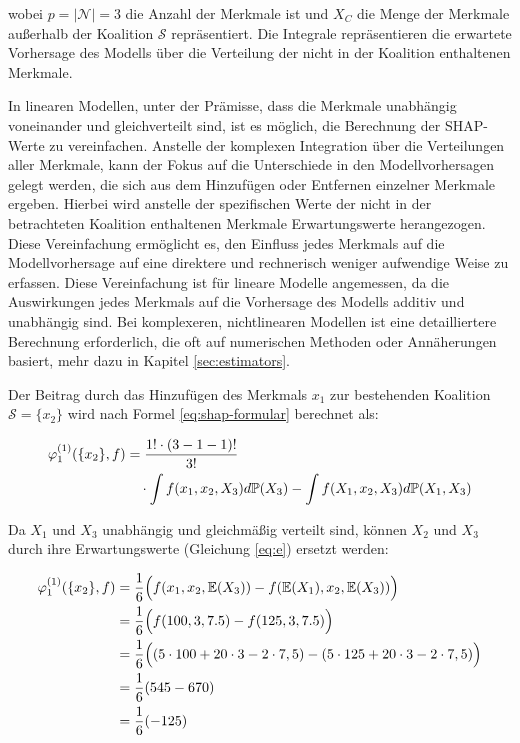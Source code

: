 wobei $p = |\mathcal{N}| = 3$ die Anzahl der Merkmale ist und $X_C$ die Menge der Merkmale 
außerhalb der Koalition $\mathcal{S}$ repräsentiert. Die Integrale repräsentieren die erwartete 
Vorhersage des Modells über die Verteilung der nicht in der Koalition enthaltenen Merkmale.

In linearen Modellen, unter der Prämisse, dass die Merkmale unabhängig voneinander und gleichverteilt sind, 
ist es möglich, die Berechnung der SHAP-Werte zu vereinfachen. Anstelle der komplexen Integration 
über die Verteilungen aller Merkmale, kann der Fokus auf die Unterschiede in den Modellvorhersagen gelegt werden, 
die sich aus dem Hinzufügen oder Entfernen einzelner Merkmale ergeben. 
Hierbei wird anstelle der spezifischen Werte der nicht in der betrachteten Koalition enthaltenen Merkmale 
Erwartungswerte herangezogen. Diese Vereinfachung ermöglicht es, den Einfluss jedes Merkmals auf 
die Modellvorhersage auf eine direktere und rechnerisch weniger aufwendige Weise zu erfassen.
Diese Vereinfachung ist für lineare Modelle angemessen, da die Auswirkungen jedes Merkmals 
auf die Vorhersage des Modells additiv und unabhängig sind. Bei komplexeren, 
nichtlinearen Modellen ist eine detailliertere Berechnung erforderlich, 
die oft auf numerischen Methoden oder Annäherungen basiert, mehr dazu in Kapitel \ref{sec:estimators}.

Der Beitrag durch das Hinzufügen des Merkmals $x_1$ zur bestehenden Koalition $\mathcal{S} = \{x_2\}$ wird
nach Formel \ref{eq:shap-formular} berechnet als:

\begin{align}
    \varphi^{(1)}_{1}(\{x_2\}, f) &= \frac{1! \cdot (3 - 1 - 1)!}{3!} \\ \notag
        &\quad \cdot \int f(x_1, x_2 , X_3) d\mathbb{P}(X_3) - \int f(X_1, x_2, X_3) d\mathbb{P}(X_1, X_3)
\end{align}

Da \( X_1 \) und \( X_3 \) unabhängig und gleichmäßig verteilt sind, können \( X_2 \) und \( X_3 \) durch ihre Erwartungswerte (Gleichung \ref{eq:e}) ersetzt werden:

\begin{align}
    \varphi^{(1)}_{1}(\{x_2\}, f) &= \frac{1}{6} \Big(f(x_1, x_2, \mathbb{E}(X_3)) - f(\mathbb{E}(X_1), x_2, \mathbb{E}(X_3))\Big) \\ \notag
        &= \frac{1}{6} \Big( f(100, 3, 7.5) - f(125, 3, 7.5) \Big) \\ \notag
        &= \frac{1}{6} \Big( (5 \cdot 100 + 20 \cdot 3 - 2 \cdot 7,5) - (5 \cdot 125 + 20 \cdot 3 - 2 \cdot 7,5) \Big) \\ \notag
        &= \frac{1}{6} (545 - 670) \\ \notag
        &= \frac{1}{6} (-125)
\end{align}
 
